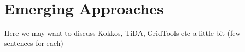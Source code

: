 %
%
%
%

\section{Emerging Approaches}
Here we may want to discuss Kokkos, TiDA, GridTools etc a little bit (few sentences for each)

